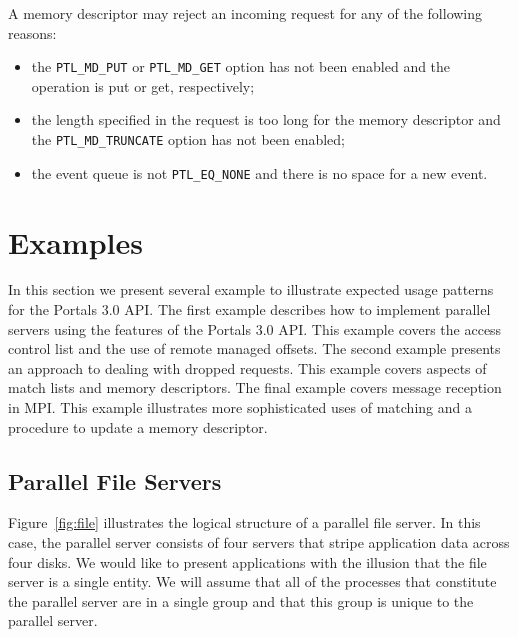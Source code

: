 \documentclass{sand-report}
\begin{document}
A memory descriptor may reject an incoming request for any of the
following reasons:
\begin{itemize}
\item the \texttt{PTL_MD_PUT} or \texttt{PTL_MD_GET} option has not
  been enabled and the operation is put or get, respectively;
\item the length specified in the request is too long for the memory
  descriptor and the \texttt{PTL_MD_TRUNCATE} option has not been
  enabled;
\item the event queue is not \texttt{PTL_EQ_NONE} and there is no
  space for a new event.
\end{itemize}

\section{Examples}\label{sec:examples}

In this section we present several example to illustrate expected
usage patterns for the Portals 3.0 API.  The first example describes
how to implement parallel servers using the features of the Portals
3.0 API.  This example covers the access control list and the use of
remote managed offsets.  The second example presents an approach to
dealing with dropped requests.  This example covers aspects of match
lists and memory descriptors.  The final example covers message
reception in MPI.  This example illustrates more sophisticated uses of
matching and a procedure to update a memory descriptor.

\subsection{Parallel File Servers}\label{sec:expfs}

Figure~\ref{fig:file} illustrates the logical structure of a parallel
file server.  In this case, the parallel server consists of four
servers that stripe application data across four disks.  We would like
to present applications with the illusion that the file server is a
single entity.  We will assume that all of the processes that
constitute the parallel server are in a single group and that this
group is unique to the parallel server.
\end{document}

